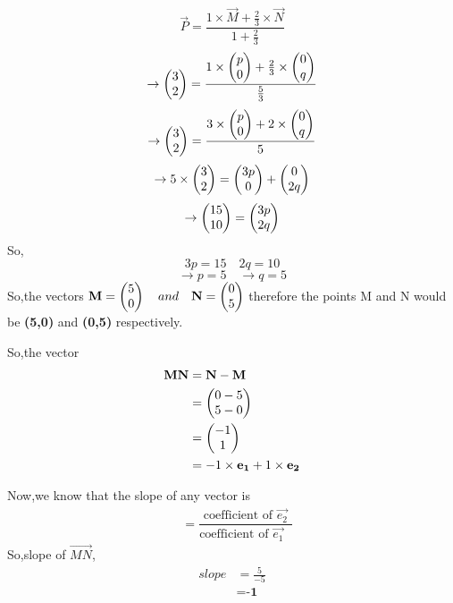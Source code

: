 \documentclass[journal,12pt,twocolumn]{IEEEtran}
\begin{document}
\begin{equation*}
    \vec{P}=\frac{1\times \vec{M}+\frac{2}{3}\times \vec{N}}{1+\frac{2}{3}}
\end{equation*}
\begin{equation*}
    \rightarrow\begin{pmatrix}3 \\ 2\end{pmatrix}=\frac{1\times \begin{pmatrix}p\\0\end{pmatrix}+\frac{2}{3}\times \begin{pmatrix}0\\q\end{pmatrix}}{\frac{5}{3}}
\end{equation*}
\begin{equation*}
\rightarrow\begin{pmatrix}3 \\ 2\end{pmatrix}=\frac{3\times \begin{pmatrix}p\\0\end{pmatrix}+2\times \begin{pmatrix}0\\q\end{pmatrix}}{5}
\end{equation*}
\begin{equation*}
    \rightarrow 5\times \begin{pmatrix}3\\2\end{pmatrix}=\begin{pmatrix}3p\\0\end{pmatrix}+\begin{pmatrix}0\\2q\end{pmatrix}
\end{equation*}
\begin{equation}
\rightarrow\begin{pmatrix}15\\10\end{pmatrix}=\begin{pmatrix}3p\\2q\end{pmatrix} 
\end{equation}
So,
\begin{equation*}
3p=15\quad 2q=10
\end{equation*}
\begin{equation}
\rightarrow p=5\quad \rightarrow q=5      
\end{equation}
So,the vectors $\mathbf{M}=\begin{pmatrix}5\\0\end{pmatrix} \quad and \quad \mathbf{N}=\begin{pmatrix}0\\5\end{pmatrix}$ 
therefore the points M and N would be \textbf{(5,0)} and \textbf{(0,5)} respectively.

So,the vector
\begin{align}
\mathbf{MN}&=\mathbf{N}-\mathbf{M}\\
&=\begin{pmatrix}0-5\\5-0\end{pmatrix}\\
&=\begin{pmatrix}-1\\1\end{pmatrix}\\
&=-1\times \mathbf{e_1}+1\times \mathbf{e_2}
\end{align}

Now,we know that the slope of any vector is
\begin{align}
    &= \dfrac{\text{coefficient of $\vec{e_2}$}}{\text{coefficient of $\vec{e_1}$ }}
\end{align}
So,slope of $\vec{MN}$,
 \begin{align}
  slope &=\frac{5}{-5}\\
  &=\textbf{-1}             
\end{align}
\end{document}
